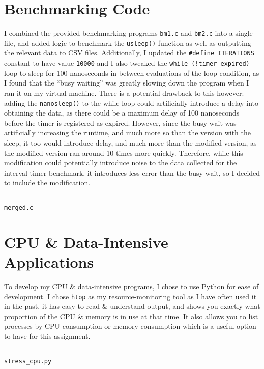 \documentclass[a4paper]{article}
\newenvironment{code}{\captionsetup{type=listing}}{}
\begin{document}
\section{Benchmarking Code}
I combined the provided benchmarking programs \verb|bm1.c| and \verb|bm2.c| into a single file, and added logic to benchmark the \texttt{usleep()} function as well as outputting the relevant data to CSV files.
Additionally, I updated the \texttt{#define ITERATIONS} constant to have value \texttt{10000} and I also tweaked the \texttt{while (!timer_expired)} loop to sleep for 100 nanoseconds in-between evaluations of the loop condition, as I found that the ``busy waiting'' was greatly slowing down the program when I ran it on my virtual machine.
There is a potential drawback to this however:
adding the \texttt{nanosleep()} to the while loop could artificially introduce a delay into obtaining the data, as there could be a maximum delay of 100 nanoseconds before the timer is registered as expired.
However, since the busy wait was artificially increasing the runtime, and much more so than the version with the sleep, it too would introduce delay, and much more than the modified version, as the modified version ran around 10 times more quickly.
Therefore, while this modification could potentially introduce noise to the data collected for the interval timer benchmark, it introduces less error than the busy wait, so I decided to include the modification.

\begin{code}
\inputminted[linenos, breaklines, frame=single]{C}{../code/benchmarks/merged.c}
\caption{\texttt{merged.c}}
\end{code}

\section{CPU \& Data-Intensive Applications}
To develop my CPU \& data-intensive programs, I chose to use Python for ease of development.
I chose \texttt{htop}\supercite{htop} as my resource-monitoring tool as I have often used it in the past, it has easy to read \& understand output, and shows you exactly what proportion of the CPU \& memory is in use at that time.
It also allows you to list processes by CPU consumption or memory consumption which is a useful option to have for this assignment.

\begin{code}
\inputminted[linenos, breaklines, frame=single]{python}{../code/stressers/stress_cpu.py}
\caption{\texttt{stress\_cpu.py}}
\end{code}
\end{document}
